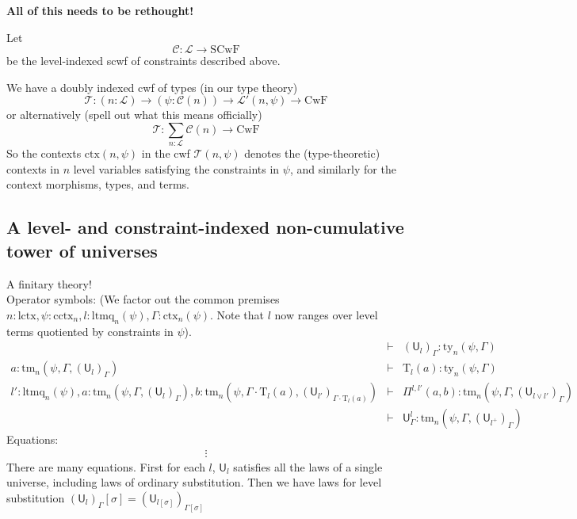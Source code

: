 \documentclass[11pt,a4paper]{article}
\theoremstyle{definition}
\newcommand{\UU}{\mathsf{U}}
\newcommand{\Ctx}{\mathrm{Ctx}}
\def\UU{\mathsf{U}}
\newcommand{\N}{\mathsf{N}}
\newcommand{\T}{\mathsf{T}}
\def\Pihat{\Pi}
\def\Ctx{\mathrm{ctx}}
\def\lctx{\mathrm{lctx}}
\def\ltm{\mathrm{ltm}}
\def\ltmq{\mathrm{ltmq}}
\def\cctx{\mathrm{cctx}}
\newcommand{\ctx}{\mathrm{ctx}}
\newcommand{\ty}{\mathrm{ty}}
\newcommand{\tm}{\mathrm{tm}}
\def\U{\mathsf{U}}
\def\T{\mathcal{T}}
\newcommand{\Ta}{\mathrm{T}}
\def\L{{\mathcal{L}}}
\def\F{\mathcal{C}}
\def\CwF{\mathrm{CwF}}
\def\SCwF{\mathrm{SCwF}}
\begin{document}
{\bf All of this needs to be rethought!}

Let 
$$
\F : \L \to \SCwF
$$
be the level-indexed scwf of constraints described above.

We have a doubly indexed cwf of types (in our type theory)
$$
\T : (n : \L) \to (\psi : \F(n)) \to \L '(n,\psi) \to \CwF
$$
or alternatively (spell out what this means officially)
$$
\T : \sum_{n : \L}\F(n) \to \CwF
$$
So the contexts $\Ctx(n,\psi)$ in the cwf $\T(n,\psi)$ denotes the (type-theoretic) contexts in $n$ level variables satisfying the constraints in $\psi$, and similarly for the context morphisms, types, and terms.

\subsection{A level- and constraint-indexed non-cumulative tower of universes}


A finitary theory!
\\
\vspace{1ex}
Operator symbols: (We  factor out the common premises $n : \lctx, \psi : \cctx_n, l : \ltmq_n(\psi), \Gamma : \ctx_n(\psi)$. Note that $l$ now ranges over level terms quotiented by constraints in $\psi$).
\begin{eqnarray*}
&\vdash& (\U_{l})_\Gamma : \ty_n(\psi,\Gamma)\\
a : \tm_n(\psi,\Gamma,(\U_{l})_\Gamma) &\vdash& {\Ta_{l}}(a) : \ty_n(\psi,\Gamma)\\
l' : \ltmq_n(\psi),
a : \tm_n(\psi,\Gamma,(\U_{l})_\Gamma),
b :  \tm_n(\psi,\Gamma \cdot \Ta_{l}(a), (\U_{l'})_{\Gamma \cdot \Ta_{l}(a)})
&\vdash&
 \Pihat^{l,l'}(a,b) : \tm_n(\psi,\Gamma,(\U_{l \vee l'})_\Gamma)\\
 &\vdash&\UU^l_\Gamma: \tm_n(\psi,\Gamma,(\UU_{l^+})_\Gamma)
\end{eqnarray*}
Equations:
\begin{eqnarray*}
&\vdots&
\end{eqnarray*}
There are many equations. First for each $l$, $\U_l$ satisfies all the laws of a single universe, including laws of ordinary substitution. Then we have laws for level substitution $(\U_{l})_\Gamma[\sigma] = (\U_{l[\sigma]})_{\Gamma[\sigma]}$
\end{document}
